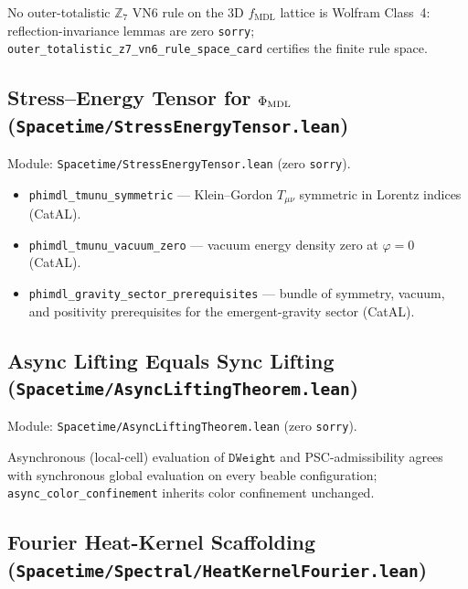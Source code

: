 \documentclass[11pt,a4paper]{article}
\newenvironment{keybox}[1]{%
  \Needspace*{8\baselineskip}%
  \begin{tcolorbox}[
    enhanced,
    breakable=false,
    colback=blue!5,
    colframe=blue!45!black,
    coltitle=black,
    colbacktitle=blue!14,
    boxrule=0.85pt,
    arc=2.5pt,
    left=9pt, right=9pt, top=6pt, bottom=6pt,
    titlerule=0.55pt,
    fonttitle=\bfseries,
    title={#1},
    before upper=\raggedright,
    before skip=0.9\baselineskip,
    after skip=0.9\baselineskip
  ]%
}{%
  \end{tcolorbox}%
}
\theoremstyle{definition}
\begin{document}
\begin{keybox}{\lstinline|no_class4_outer_totalistic_z7_3d| (zero \texttt{sorry})}
No outer-totalistic $\mathbb{Z}_7$ VN6 rule on the 3D $f_{\mathrm{MDL}}$ lattice
is Wolfram Class~4: reflection-invariance lemmas are zero \lstinline|sorry|;
\lstinline|outer_totalistic_z7_vn6_rule_space_card| certifies the finite rule space.
\end{keybox}

\subsection{Stress--Energy Tensor for \texorpdfstring{$\Phi_{\rm MDL}$}{PhiMDL}
  (\texttt{Spacetime/\allowbreak StressEnergyTensor.lean})}\label{subsec:stress-energy}

Module: \texttt{Spacetime/StressEnergyTensor.lean} (zero \lstinline|sorry|).

\begin{itemize}[nosep]
\item \lstinline|phimdl_tmunu_symmetric| --- Klein--Gordon $T_{\mu\nu}$ symmetric
  in Lorentz indices (CatAL).
\item \lstinline|phimdl_tmunu_vacuum_zero| --- vacuum energy density zero at
  $\varphi = 0$ (CatAL).
\item \lstinline|phimdl_gravity_sector_prerequisites| --- bundle of symmetry,
  vacuum, and positivity prerequisites for the emergent-gravity sector (CatAL).
\end{itemize}

\subsection{Async Lifting Equals Sync Lifting
  (\texttt{Spacetime/\allowbreak AsyncLiftingTheorem.lean})}\label{subsec:async-lifting}

Module: \texttt{Spacetime/AsyncLiftingTheorem.lean} (zero \lstinline|sorry|).

\begin{keybox}{\lstinline|async_algebraic_lifting_theorem| (zero \texttt{sorry})}
Asynchronous (local-cell) evaluation of $\mathtt{DWeight}$ and PSC-admissibility
agrees with synchronous global evaluation on every beable configuration;
\lstinline|async_color_confinement| inherits color confinement unchanged.
\end{keybox}

\subsection{Fourier Heat-Kernel Scaffolding
  (\texttt{Spacetime/\allowbreak Spectral/\allowbreak HeatKernelFourier.lean})}\label{subsec:heat-kernel-fourier}
\end{document}
